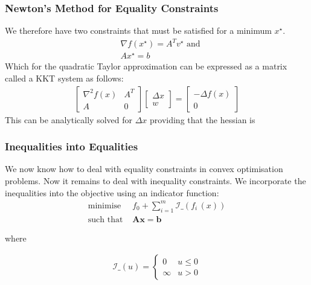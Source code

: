 \documentclass{beamer}
\begin{document}
\begin{frame}
    \frametitle{Newton's Method for Equality Constraints}
    We therefore have two constraints that must be satisfied for a minimum
    $x^{\star}$.
    \begin{align*}
        &\nabla f(x^{\star}) = A^{T} v^{\star} \text{ and} \\
        &A x^{\star} = b
    \end{align*}
    Which for the quadratic Taylor approximation can be expressed as a matrix called a KKT system as follows:
    \begin{align*}
        \begin{bmatrix}
            \nabla^{2}f(x) & A^{T} \\
            A & 0
        \end{bmatrix}
        \begin{bmatrix}
            \Delta x \\
            w
        \end{bmatrix}
        =
        \begin{bmatrix}
            -\Delta f(x) \\
            0
        \end{bmatrix}
    \end{align*}
    This can be analytically solved for $\Delta x$ providing that the hessian is
\end{frame}

\begin{frame}
    \frametitle{Inequalities into Equalities}
    We now know how to deal with equality constraints in convex optimisation
    problems. Now it remains to deal with inequality constraints.
    We incorporate the inequalities into the objective using an indicator
    function:
    \begin{align*}
        \text{minimise } \, &f_{0} +
        \sum_{i=1}^{m}\mathcal{I}\_\left(f_{i}\,(x)\right )\\
        \text{such that } & \mathbf{A}\mathbf{x} =\mathbf{b}
    \end{align*}

where

\begin{align*}
    \mathcal{I}\_(u) =
    \begin{cases}
        0 &u \leq 0 \\
        \infty &u > 0
    \end{cases}
\end{align*}
\end{frame}
\end{document}
